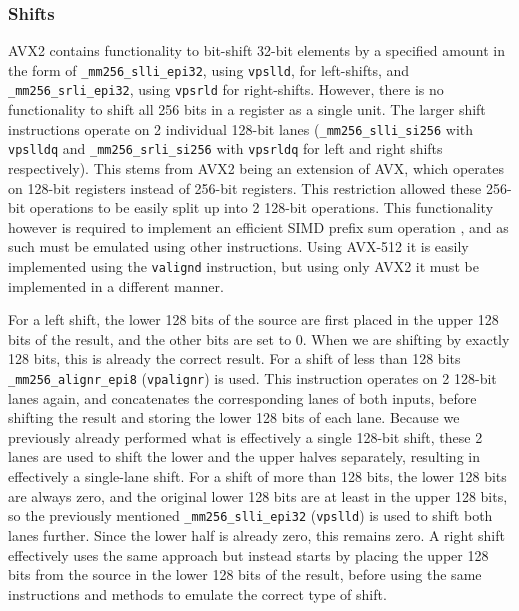 \documentclass[11pt,dvipsnames]{article}
\newcommand{\icpp}[1]{\texttt{#1}}
\newcommand{\mono}[1]{\texttt{#1}}
\begin{document}
\subsubsection*{Shifts}
AVX2 contains functionality to bit-shift 32-bit elements by a specified amount in the form of \linebreak \icpp{_mm256_slli_epi32}, using \mono{vpslld}, for left-shifts, and \icpp{_mm256_srli_epi32}, using \mono{vpsrld} for right-shifts. However, there is no functionality to shift all 256 bits in a register as a single unit. The larger shift instructions operate on 2 individual 128-bit lanes (\icpp{_mm256_slli_si256} with \mono{vpslldq} and \icpp{_mm256_srli_si256} with \mono{vpsrldq} for left and right shifts respectively). This stems from AVX2 being an extension of AVX, which operates on 128-bit registers instead of 256-bit registers. This restriction allowed these 256-bit operations to be easily split up into 2 128-bit operations. This functionality however is required to implement an efficient SIMD prefix sum operation \cite{Zhang2020ParallelPS}, and as such must be emulated using other instructions. Using AVX-512 it is easily implemented using the \mono{valignd} instruction, but using only AVX2 it must be implemented in a different manner.

For a left shift, the lower 128 bits of the source are first placed in the upper 128 bits of the result, and the other bits are set to 0. When we are shifting by exactly 128 bits, this is already the correct result. For a shift of less than 128 bits \icpp{_mm256_alignr_epi8} (\mono{vpalignr}) is used. This instruction operates on 2 128-bit lanes again, and concatenates the corresponding lanes of both inputs, before shifting the result and storing the lower 128 bits of each lane. Because we previously already performed what is effectively a single 128-bit shift, these 2 lanes are used to shift the lower and the upper halves separately, resulting in effectively a single-lane shift. For a shift of more than 128 bits, the lower 128 bits are always zero, and the original lower 128 bits are at least in the upper 128 bits, so the previously mentioned \icpp{_mm256_slli_epi32} (\mono{vpslld}) is used to shift both lanes further. Since the lower half is already zero, this remains zero. A right shift effectively uses the same approach but instead starts by placing the upper 128 bits from the source in the lower 128 bits of the result, before using the same instructions and methods to emulate the correct type of shift.
\end{document}
